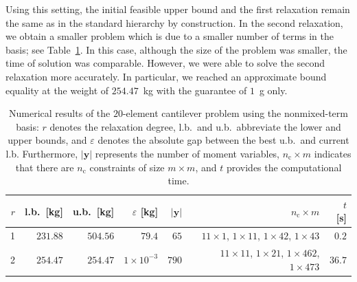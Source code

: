 \documentclass[final,onefignum,onetabnum]{siamart220329}
\begin{document}
Using this setting, the initial feasible upper bound and the first relaxation remain the same as in the standard hierarchy by construction. In the second relaxation, we obtain a smaller problem which is due to a smaller number of terms in the basis; see Table~\ref{tab:20nmt}. In this case, although the size of the problem was smaller, the time of solution was comparable. However, we were able to solve the second relaxation more accurately. In particular, we reached an approximate bound equality at the weight of $254.47$~kg with the guarantee of $1$~g only.

\begin{table}[!htbp]
    \centering
    \begin{tabular}{rrrrrrr}
         $r$ & l.b.\ [kg] & u.b.\ [kg] & $\varepsilon$ [kg] & $\lvert \mathbf{y}\rvert$ & $n_\mathrm{c} \times m$  & $t$ [s]\\ \hline
         1 & $231.88$ & $504.56$ & $79.4$ & $65$ & $11\times1$, $1\times11$, $1\times42$, $1 \times 43$ & $0.2$\\
         2 & $254.47$ & $254.47$ & $1 \times 10^{-3}$ & $790$ & $11\times11$, $1\times21$, $1\times462$, $1\times473$ & $36.7$
    \end{tabular}
    \caption{Numerical results of the $20$-element cantilever problem using the nonmixed-term basis: $r$ denotes the relaxation degree, l.b.\ and u.b.\ abbreviate the lower and upper bounds, and $\varepsilon$ denotes the absolute gap between the best u.b.\ and current l.b. Furthermore, $\lvert\mathbf{y}\rvert$ represents the number of moment variables, $n_\mathrm{c}\times m$ indicates that there are $n_\mathrm{c}$ constraints of size $m\times m$, and $t$ provides the computational time.}
    \label{tab:20nmt}
\end{table}
\end{document}
